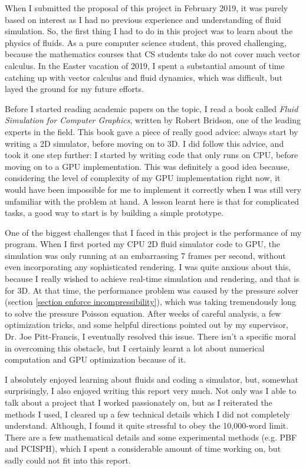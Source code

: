 When I submitted the proposal of this project in February 2019, it was purely based on interest as I had no previous experience and understanding of fluid simulation. So, the first thing I had to do in this project was to learn about the physics of fluids. As a pure computer science student, this proved challenging, because the mathematics courses that CS students take do not cover much vector calculus. In the Easter vacation of 2019, I spent a substantial amount of time catching up with vector calculus and fluid dynamics, which was difficult, but layed the ground for my future efforts.

Before I started reading academic papers on the topic, I read a book called \textit{Fluid Simulation for Computer Graphics}\cite{bridson2015fluid}, written by Robert Bridson, one of the leading experts in the field. This book gave a piece of really good advice: always start by writing a 2D simulator, before moving on to 3D. I did follow this advice, and took it one step further: I started by writing code that only runs on CPU, before moving on to a GPU implementation. This was definitely a good idea because, considering the level of complexity of my GPU implementation right now, it would have been impossible for me to implement it correctly when I was still very unfamiliar with the problem at hand. A lesson learnt here is that for complicated tasks, a good way to start is by building a simple prototype.

One of the biggest challenges that I faced in this project is the performance of my program. When I first ported my CPU 2D fluid simulator code to GPU, the simulation was only running at an embarrassing 7 frames per second, without even incorporating any sophisticated rendering. I was quite anxious about this, because I really wished to achieve real-time simulation and rendering, and that is for 3D. At that time, the performance problem was caused by the pressure solver (section \ref{section enforce incompressibility}), which was taking tremendously long to solve the pressure Poisson equation. After weeks of careful analysis, a few optimization tricks, and some helpful directions pointed out by my supervisor, Dr. Joe Pitt-Francis, I eventually resolved this issue. There isn't a specific moral in overcoming this obstacle, but I certainly learnt a lot about numerical computation and GPU optimization because of it.

I absolutely enjoyed learning about fluids and coding a simulator, but, somewhat surprisingly, I also enjoyed writing this report very much. Not only was I able to talk about a project that I worked passionately on, but as I reiterated the methods I used, I cleared up a few technical details which I did not completely understand. Although, I found it quite stressful to obey the 10,000-word limit. There are a few mathematical details and some experimental methods (e.g. PBF and PCISPH), which I spent a considerable amount of time working on, but sadly could not fit into this report.

